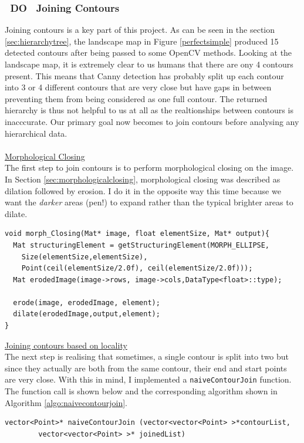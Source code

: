 \documentclass[11pt]{article}
\begin{document}
\subsubsection{~DO~ Joining Contours}
Joining contours is a key part of this project. As can be seen in the
section \ref{sec:hierarchytree}, the landscape map in Figure 
\ref{perfectsimple} produced 15 detected contours after being
passed to some OpenCV methods. Looking at the landscape map, it is
extremely clear to us humans that there are ony 4 contours present.
This means that Canny detection has probably split up each contour into
3 or 4 different contours that are very close but have gaps in between
preventing them from being considered as one full contour. The returned
hierarchy is thus not helpful to us at all as the realtionships between
contours is inacccurate. Our primary goal now becomes to join contours
before analysing any hierarchical data.\\
\\
\underline{Morphological Closing}\\
The first step to join contours is to perform morphological closing on 
the image. In Section \ref{sec:morphologicalclosing}, morphological closing 
was described as dilation followed by erosion. I do it in the opposite
way this time because we want the \textit{darker} areas (pen!) to expand
rather than the typical brighter areas to dilate.

\begin{lstlisting}
void morph_Closing(Mat* image, float elementSize, Mat* output){
  Mat structuringElement = getStructuringElement(MORPH_ELLIPSE,
	Size(elementSize,elementSize),
	Point(ceil(elementSize/2.0f), ceil(elementSize/2.0f)));
  Mat erodedImage(image->rows, image->cols,DataType<float>::type);
  
  erode(image, erodedImage, element);
  dilate(erodedImage,output,element);
}
\end{lstlisting}


\underline{Joining contours based on locality}\\
The next step is realising that sometimes, a single contour is split into
two but since they actually are both from the same contour, their end and
start points are very close. With this in mind, I implemented a 
\texttt{naiveContourJoin} function. The function call is shown below and
the corresponding algorithm shown in Algorithm \ref{algo:naivecontourjoin}.

\begin{lstlisting}
vector<Point>* naiveContourJoin (vector<vector<Point> >*contourList, 
		vector<vector<Point> >* joinedList)
\end{lstlisting}
\end{document}
